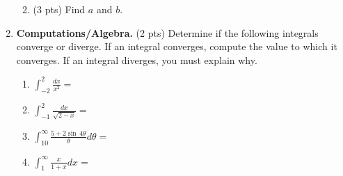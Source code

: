 \documentclass[11pt,letterpaper]{article}
\begin{document}
\begin{enumerate}
\begin{enumerate}
\vspace{10pc}
\item (3 pts) Find $a$ and $b$.

\vspace{10pc}
\end{enumerate}

\vspace{1pc}

\item \textbf{Computations/Algebra.} (2 pts)  Determine if the following integrals converge or diverge.  If an integral converges, compute the value to which it converges.  If an integral diverges, you must explain why.  \begin{enumerate}
\item $\int_{-2}^2\frac{dx}{x^2}=$

\vspace{10pc}
\item $\int_{-1}^2\frac{dx}{\sqrt{2-x}}=$

\vspace{10pc}
\item $\int_{10}^{\infty}\frac{5+2\sin\,4\theta}{\theta}d\theta=$

\vspace{10pc}
\item $\int_1^{\infty}\frac{x}{1+x}dx=$

\end{enumerate}

\end{enumerate}
\end{document}

